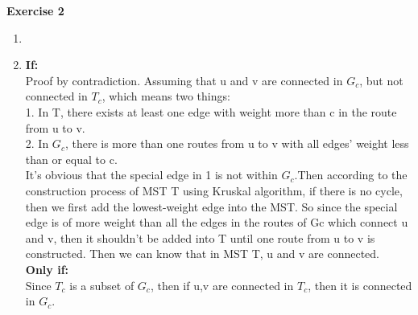 \documentclass[12pt, notitlepage]{article}
\begin{document}
\textbf{Exercise 2}
\begin{enumerate}
\item
\item
\textbf{If:}\\
Proof by contradiction. Assuming that u and v are connected in $G_c$, but not connected in $T_c$, which means two things:\\
1. In T, there exists at least one edge with weight more than c in the route from u to v. \\
2. In $G_c$, there is more than one routes from u to v with all edges' weight less than or equal to c.\\
It's obvious that the special edge in 1 is not within $G_c$.Then according to the construction process of MST T using Kruskal algorithm,  if there is no cycle, then we first add the lowest-weight edge into the MST. So since the special edge is of more weight than all the edges in the routes of Gc which connect u and v, then it shouldn't be added into T until one route from u to v is constructed. Then we can know that in MST T, u and v are connected.\\
\textbf{Only if:}\\
Since $T_c$ is a subset of $G_c$, then if u,v are connected in $T_c$, then it is connected in $G_c$.
\end{enumerate}
\end{document}
